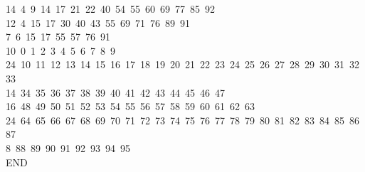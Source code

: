 \begin{tabbing}
14\ 4\ 9\ 14\ 17\ 21\ 22\ 40\ 54\ 55\ 60\ 69\ 77\ 85\ 92\\[0pt]
12\ 4\ 15\ 17\ 30\ 40\ 43\ 55\ 69\ 71\ 76\ 89\ 91\\[0pt]
7\ 6\ 15\ 17\ 55\ 57\ 76\ 91\\[0pt]
10\ 0\ 1\ 2\ 3\ 4\ 5\ 6\ 7\ 8\ 9\\[0pt]
24\ 10\ 11\ 12\ 13\ 14\ 15\ 16\ 17\ 18\ 19\ 20\ 21\ 22\ 23\ 24\ 25\ 26\ 27\ 28\ 29\ 30\ 31\ 32\ 33\\[0pt]
14\ 34\ 35\ 36\ 37\ 38\ 39\ 40\ 41\ 42\ 43\ 44\ 45\ 46\ 47\\[0pt]
16\ 48\ 49\ 50\ 51\ 52\ 53\ 54\ 55\ 56\ 57\ 58\ 59\ 60\ 61\ 62\ 63\\[0pt]
24\ 64\ 65\ 66\ 67\ 68\ 69\ 70\ 71\ 72\ 73\ 74\ 75\ 76\ 77\ 78\ 79\ 80\ 81\ 82\ 83\ 84\ 85\ 86\ 87\\[0pt]
8\ 88\ 89\ 90\ 91\ 92\ 93\ 94\ 95\\[0pt]
END\\[0pt]
\end{tabbing}
